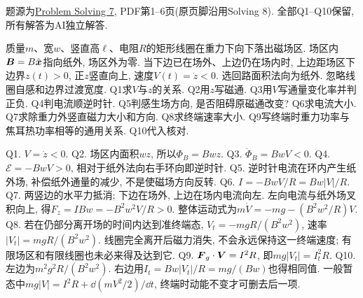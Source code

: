 题源为\href{https://ocw.mit.edu/courses/8-02-physics-ii-electricity-and-magnetism-spring-2007/resources/solving07/}{Problem Solving 7}, PDF第1--6页(原页脚沿用Solving 8). 全部Q1--Q10保留, 所有解答为AI独立解答.

\begin{exercise}
质量$m$、宽$w$、竖直高$\ell$、电阻$R$的矩形线圈在重力下向下落出磁场区. 场区内$\boldsymbol{B}=B\hat{\boldsymbol{x}}$指向纸外, 场区外为零. 当下边已在场外、上边仍在场内时, 上边距场区下边界$z(t)>0$, 正$z$竖直向上, 速度$V(t)=\dot z<0$. 选回路面积法向为纸外. 忽略线圈自感和边界过渡宽度.
Q1求$V$与$z$的关系.
Q2用$z$写磁通.
Q3用$V$写通量变化率并判正负.
Q4判电流顺逆时针.
Q5判感生场方向, 是否阻碍原磁通改变?
Q6求电流大小.
Q7求除重力外竖直磁力大小和方向.
Q8求终端速率大小.
Q9写终端时重力功率与焦耳热功率相等的通用关系.
Q10代入核对.
\end{exercise}
\begin{solution}
Q1. $V=\dot z<0$. Q2. 场区内面积$wz$, 所以$\Phi_B=Bwz$.
Q3. $\dot\Phi_B=BwV<0$.
Q4. $\mathcal E=-BwV>0$, 相对于纸外法向右手环向即逆时针.
Q5. 逆时针电流在环内产生纸外场, 补偿纸外通量的减少, 不是使磁场方向反转.
Q6. $I=-BwV/R=Bw|V|/R$.
Q7. 两竖边的水平力抵消; 下边在场外, 上边在场内电流向左. 左向电流与纸外场叉积向上, 得$F_z=IBw=-B^2w^2V/R>0$. 整体运动式为$m\dot V=-mg-(B^2w^2/R)V$.
Q8. 若在仍部分离开场的时间内达到准终端态, $V_t=-mgR/(B^2w^2)$, 速率$|V_t|=mgR/(B^2w^2)$. 线圈完全离开后磁力消失, 不会永远保持这一终端速度; 有限场区和有限线圈也未必来得及达到它.
Q9. $\boldsymbol{F}_g\cdot\boldsymbol{V}=I^2R$, 即$mg|V_t|=I_t^2R$.
Q10. 左边为$m^2g^2R/(B^2w^2)$. 右边用$I_t=Bw|V_t|/R=mg/(Bw)$也得相同值. 一般暂态中$mg|V|=I^2R+\dd(mV^2/2)/\dd t$, 终端时动能不变才可删去后一项.
\end{solution}
